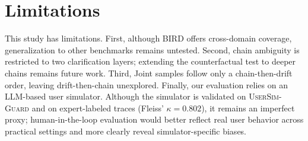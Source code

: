 \section*{Limitations}
\label{sec:limitations}

This study has limitations. First, although BIRD offers cross-domain coverage, generalization to other benchmarks remains untested. Second, chain ambiguity is restricted to two clarification layers; extending the counterfactual test to deeper chains remains future work. Third, Joint samples follow only a chain-then-drift order, leaving drift-then-chain unexplored. Finally, our evaluation relies on an LLM-based user simulator. Although the simulator is validated on \textsc{UserSim-Guard} and on expert-labeled traces (Fleiss' $\kappa = 0.802$), it remains an imperfect proxy; human-in-the-loop evaluation would better reflect real user behavior across practical settings and more clearly reveal simulator-specific biases.
